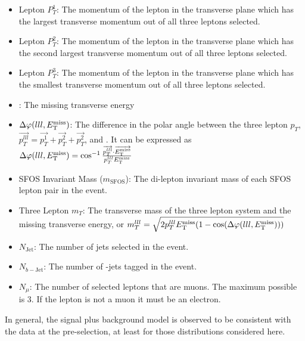 \begin{itemize}
\item Lepton $P_{T}^{1}$:  The momentum of the lepton in the transverse plane
which has the largest transverse momentum out of all three leptons selected.
\item Lepton $P_{T}^{2}$:  The momentum of the lepton in the transverse plane
which has the second largest transverse momentum out of all three leptons selected.
\item Lepton $P_{T}^{3}$:  The momentum of the lepton in the transverse plane
which has the smallest transverse momentum out of all three leptons selected.
\item \MET:  The missing transverse energy
\item $\Delta\varphi(lll,E_{\mathrm{T}}^{\mathrm{miss}})$:  The difference in the polar angle 
between the three lepton $p_{T}$, 
$\overrightarrow{p_{T}^{lll}} =  \overrightarrow{p_{T}^{1}}+ 
\overrightarrow{p_{T}^{2}}+ \overrightarrow{p_{T}^{2}}$, 
and \MET. It can be expressed as 
$\Delta\varphi(lll,E_{\mathrm{T}}^{\mathrm{miss}}) = \cos^{-1}\frac{ \overrightarrow{p_{T}^{lll}}\cdot\overrightarrow{E_{\mathrm{T}}^{\mathrm{miss}}} }{ p_{T}^{lll}E_{\mathrm{T}}^{\mathrm{miss}} } $
\item SFOS Invariant Mass ($m_{\textrm{SFOS}}$): The di-lepton invariant mass
of each SFOS lepton pair in the event. %
\item Three Lepton $m_{T}$: The transverse mass of the three lepton system
and the missing transverse energy, or
$m_{T}^{lll} = \sqrt{2p_{T}^{lll}E_{\mathrm{T}}^{\mathrm{miss}}(1-\cos(\Delta\varphi(lll,E_{\mathrm{T}}^{\mathrm{miss}})))}$ 
\item $N_{\textrm{Jet}}$: The number of jets selected in the event.
\item $N_{b-\textrm{Jet}}$: The number of \bee-jets tagged in the event.
\item $N_{\mu}$: The number of selected leptons that are muons. The maximum
possible is 3. If the lepton is not a muon it must be an electron.
\end{itemize}
In general, the signal plus background model is observed to be consistent
with the data at the pre-selection, at least for those distributions
considered here.



